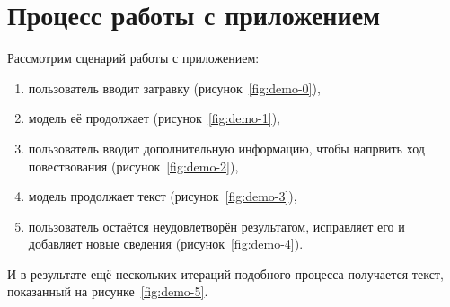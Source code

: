 \section{Процесс работы с приложением}

Рассмотрим сценарий работы с приложением:
\begin{enumerate}
    \item пользователь вводит затравку (рисунок \ref*{fig:demo-0}),
    \item модель её продолжает (рисунок \ref*{fig:demo-1}),
    \item пользователь вводит дополнительную информацию, чтобы напрвить ход повествования (рисунок \ref*{fig:demo-2}),
    \item модель продолжает текст (рисунок \ref*{fig:demo-3}),
    \item пользователь остаётся неудовлетворён результатом, исправляет его и добавляет новые сведения (рисунок \ref*{fig:demo-4}).
\end{enumerate}

И в результате ещё нескольких итераций подобного процесса получается текст, показанный на рисунке \ref*{fig:demo-5}.

